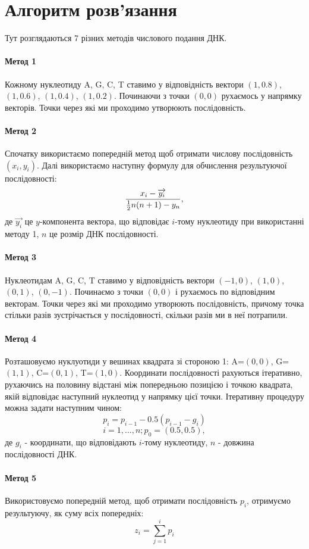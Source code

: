 \documentclass[14pt]{extarticle}
\begin{document}
\section{Алгоритм розв’язання}
Тут розглядаються 7 різних методів числового подання ДНК.
\paragraph{Метод 1}
Кожному нуклеотиду A, G, C, T ставимо у відповідність вектори $(1,0.8)$, $(1,0.6)$, $(1,0.4)$, $(1,0.2)$. Починаючи з точки $(0,0)$ рухаємось у напрямку векторів. Точки через які ми проходимо утворюють послідовність.
\paragraph{Метод 2}
Спочатку використаємо попередній метод щоб отримати числову послідовність $(x_i,y_i)$. Далі використаємо наступну формулу для обчислення результуючої послідовності:
\[{x_i-\overrightarrow{y_i} \over{{1\over2}n(n+1)-y_n}},\]
де $\overrightarrow{y_i}$ це $y$-компонента вектора, що відповідає $i$-тому нуклеотиду при використанні методу 1, $n$ це розмір ДНК послідовності.
\paragraph{Метод 3}
Нуклеотидам A, G, C, T ставимо у відповідність вектори $(-1,0)$, $(1,0)$, $(0,1)$, $(0,-1)$. Починаємо з точки $(0,0)$ і рухаємось по відповідним векторам. Точки через які ми проходимо утворюють послідовність, причому точка стільки разів зустрічається у послідовності, скільки разів ми в неї потрапили.
\paragraph{Метод 4}
Розташовуємо нуклуотиди у вешинах квадрата зі стороною 1: A=$(0,0)$, G=$(1,1)$, C=$(0,1)$, T=$(1,0)$. Координати послідовності рахуються ітеративно, рухаючись на половину відстані між попередньою позицією і точкою квадрата, якій відповідає наступний нуклеотид у напрямку цієї точки. Ітеративну процедуру можна задати наступним чином:
\[p_i = p_{i-1}-0.5(p_{i-1}-g_i)\]
\[i=1,...,n; p_0=(0.5,0.5),\]
де $g_i$ - координати, що відповідають $i$-тому нуклеотиду, $n$ - довжина послідовності ДНК.
\paragraph{Метод 5}
Використовуємо попередній метод, щоб отримати послідовність $p_i$, отримуємо результуючу, як суму всіх попередніх:
\[z_i = \sum_{j=1}^{i} p_i\]
\end{document}
